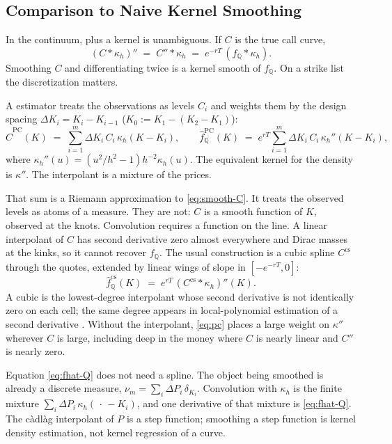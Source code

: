 \documentclass[preprint,12pt,authoryear,times]{elsarticle}
\newcommand{\Q}{\mathbb{Q}}
\begin{document}
\subsection{Comparison to Naive Kernel Smoothing}
\label{sec:naive}

In the continuum, \citeauthor{breeden1978} plus a kernel is unambiguous. If \(C\) is the true call curve,
\begin{equation}
\label{eq:smooth-C}
(C\ast\kappa_h)''
\;=\;
C''\ast\kappa_h
\;=\;
e^{-rT}\,(f_{\Q}\ast\kappa_h).
\end{equation}
Smoothing \(C\) and differentiating twice is a kernel smooth of \(f_{\Q}\). On a strike list the discretization matters.

A \citeauthor{priestley1972} estimator treats the observations as levels \(C_i\) and weights them by the design spacing \(\Delta K_i=K_i-K_{i-1}\) (\(K_0:=K_1-(K_2-K_1)\)):
\begin{equation}
\label{eq:pc}
\hat C^{\mathrm{PC}}(K)
\;=\;
\sum_{i=1}^m\Delta K_i\,C_i\,\kappa_h(K-K_i),
\qquad
\hat f_{\Q}^{\mathrm{PC}}(K)
\;=\;
e^{rT}\sum_{i=1}^m\Delta K_i\,C_i\,\kappa_h''(K-K_i),
\end{equation}
where \(\kappa_h''(u)=(u^2/h^2-1)h^{-2}\kappa_h(u)\). The equivalent kernel for the density is \(\kappa''\). The interpolant is a mixture of the prices.

That sum is a Riemann approximation to \eqref{eq:smooth-C}. It treats the observed levels as atoms of a measure. They are not: \(C\) is a smooth function of \(K\), observed at the knots. Convolution requires a function on the line. A linear interpolant of \(C\) has second derivative zero almost everywhere and Dirac masses at the kinks, so it cannot recover \(f_{\Q}\). The usual construction is a cubic spline \(C^{\mathrm{cs}}\) through the quotes, extended by linear wings of slope in \([-e^{-rT},0]\):
\begin{equation}
\label{eq:pc-cubic}
\hat f_{\Q}^{\mathrm{cs}}(K)
\;=\;
e^{rT}\,(C^{\mathrm{cs}}\ast\kappa_h)''(K).
\end{equation}
A cubic is the lowest-degree interpolant whose second derivative is not identically zero on each cell; the same degree appears in local-polynomial estimation of a second derivative \citep{aitsahalia2003}. Without the interpolant, \eqref{eq:pc} places a large weight on \(\kappa''\) wherever \(C\) is large, including deep in the money where \(C\) is nearly linear and \(C''\) is nearly zero.

Equation \eqref{eq:fhat-Q} does not need a spline. The object being smoothed is already a discrete measure, \(\nu_m=\sum_i\Delta P_i\,\delta_{K_i}\). Convolution with \(\kappa_h\) is the finite mixture \(\sum_i\Delta P_i\,\kappa_h(\,\cdot\,-K_i)\), and one derivative of that mixture is \eqref{eq:fhat-Q}. The c\`adl\`ag interpolant of \(P\) is a step function; smoothing a step function is kernel density estimation, not kernel regression of a curve.
\end{document}
